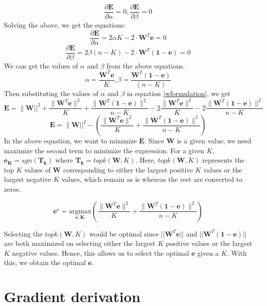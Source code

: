 \begin{equation}\frac{\partial \mathbf{E}}{\partial \alpha} = 0 , \frac{\partial \mathbf{E}}{\partial \beta} = 0 \end{equation}
Solving the above, we get the equations:
$$ \frac{\partial \mathbf{E}}{\partial \alpha} = 2 \alpha K - 2 \cdot \mathbf{W}^T\mathbf{e} = 0 $$ $$ \frac{\partial \mathbf{E}}{\partial \beta} = 2 \beta (n-K) - 2 \cdot \mathbf{W}^T(\mathbf{1-e}) = 0  $$
We can get the values of $\alpha$ and $\beta$ from the above equations.
$$ \alpha = \frac{\mathbf{W}^T\mathbf{e}}{K} , \beta = \frac{\mathbf{W}^T(\mathbf{1-e})}{(n-K)} $$ 
Then substituting the values of $\alpha$ and $\beta$ in equation \ref{wformulation}, we get
\begin{dmath} 
\mathbf{E} = \parallel \mathbf{W} ||^2 + \frac{ \parallel \mathbf{W}^T\mathbf{e} \parallel^{2}}{K} + \frac{\parallel \mathbf{W}^{T}\mathbf{(1-e)}\parallel^{2}}{n-K} - 2\frac{\parallel \mathbf{W}^{T}\mathbf{e} \parallel^{2}}{K} - 2\frac{\parallel \mathbf{W}^{T}\mathbf{(1-e)}\parallel^{2}}{n-K} 
\end{dmath}
\begin{dmath}
\mathbf{E} = \parallel \mathbf{W} ||^2 - (\frac{ \parallel \mathbf{W}^T\mathbf{e} \parallel^{2}}{K} + \frac{\parallel \mathbf{W}^{T}\mathbf{(1-e)}\parallel^{2}}{n-K})
\end{dmath}
In the above equation, we want to minimize $\mathbf{E}$. Since $\mathbf{W}$ is a given value, we need maximize the second term to minimize the expression. For a given $K$, $\mathbf{e_K} = sgn(\mathbf{T_k})$ where $\mathbf{T_k} = topk(\mathbf{W},K)$.
Here, $topk(\mathbf{W},K)$ represents the top $K$ values of $\mathbf{W}$ corresponding to either the largest positive $K$ values or the largest negative $K$ values, which remain as is whereas the rest are converted to zeros.

$$ \mathbf{e}^\star  = \underset{\mathbf{e,K}}{\mathrm{argmax}} (\frac{ \parallel \mathbf{W}^T\mathbf{e} \parallel^{2}}{K} + \frac{\parallel \mathbf{W}^{T}\mathbf{(1-e)}\parallel^{2}}{n-K}) $$

\noindent  Selecting the $topk(\mathbf{W},K)$ would be optimal since $||\mathbf{W}^{T}\mathbf{e}||$ and $||\mathbf{W}^{T}\mathbf{(1-e)}||$ are both maximized on selecting either the largest $K$ positive values or the largest $K$ negative values. Hence, this allows us to select the optimal $\mathbf{e}$ given a $K$.
With this, we obtain the optimal $\mathbf{e}$.

\section{Gradient derivation}

